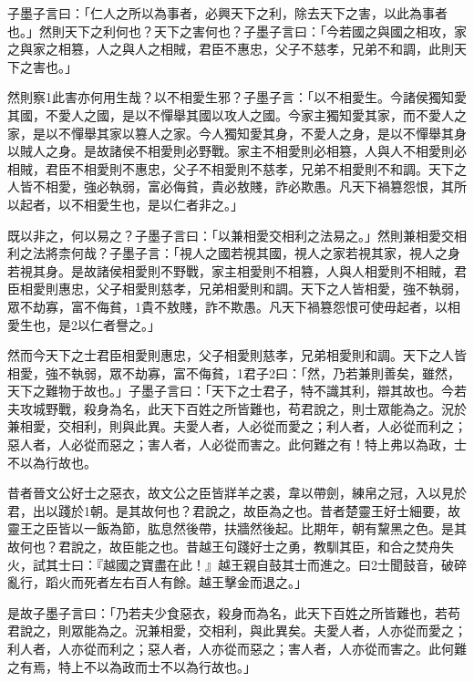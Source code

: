 
\begin{pinyinscope}
子墨子言曰：「仁人之所以為事者，必興天下之利，除去天下之害，以此為事者也。」然則天下之利何也？天下之害何也？子墨子言曰：「今若國之與國之相攻，家之與家之相篡，人之與人之相賊，君臣不惠忠，父子不慈孝，兄弟不和調，此則天下之害也。」

然則察1此害亦何用生哉？以不相愛生邪？子墨子言：「以不相愛生。今諸侯獨知愛其國，不愛人之國，是以不憚舉其國以攻人之國。今家主獨知愛其家，而不愛人之家，是以不憚舉其家以篡人之家。今人獨知愛其身，不愛人之身，是以不憚舉其身以賊人之身。是故諸侯不相愛則必野戰。家主不相愛則必相篡，人與人不相愛則必相賊，君臣不相愛則不惠忠，父子不相愛則不慈孝，兄弟不相愛則不和調。天下之人皆不相愛，強必執弱，富必侮貧，貴必敖賤，詐必欺愚。凡天下禍篡怨恨，其所以起者，以不相愛生也，是以仁者非之。」

既以非之，何以易之？子墨子言曰：「以兼相愛交相利之法易之。」然則兼相愛交相利之法將柰何哉？子墨子言：「視人之國若視其國，視人之家若視其家，視人之身若視其身。是故諸侯相愛則不野戰，家主相愛則不相篡，人與人相愛則不相賊，君臣相愛則惠忠，父子相愛則慈孝，兄弟相愛則和調。天下之人皆相愛，強不執弱，眾不劫寡，富不侮貧，1貴不敖賤，詐不欺愚。凡天下禍篡怨恨可使毋起者，以相愛生也，是2以仁者譽之。」

然而今天下之士君臣相愛則惠忠，父子相愛則慈孝，兄弟相愛則和調。天下之人皆相愛，強不執弱，眾不劫寡，富不侮貧，1君子2曰：「然，乃若兼則善矣，雖然，天下之難物于故也。」子墨子言曰：「天下之士君子，特不識其利，辯其故也。今若夫攻城野戰，殺身為名，此天下百姓之所皆難也，苟君說之，則士眾能為之。況於兼相愛，交相利，則與此異。夫愛人者，人必從而愛之；利人者，人必從而利之；惡人者，人必從而惡之；害人者，人必從而害之。此何難之有！特上弗以為政，士不以為行故也。

昔者晉文公好士之惡衣，故文公之臣皆牂羊之裘，韋以帶劍，練帛之冠，入以見於君，出以踐於1朝。是其故何也？君說之，故臣為之也。昔者楚靈王好士細要，故靈王之臣皆以一飯為節，肱息然後帶，扶牆然後起。比期年，朝有黧黑之色。是其故何也？君說之，故臣能之也。昔越王句踐好士之勇，教馴其臣，和合之焚舟失火，試其士曰：『越國之寶盡在此！』越王親自鼓其士而進之。曰2士聞鼓音，破碎亂行，蹈火而死者左右百人有餘。越王擊金而退之。」

是故子墨子言曰：「乃若夫少食惡衣，殺身而為名，此天下百姓之所皆難也，若苟君說之，則眾能為之。況兼相愛，交相利，與此異矣。夫愛人者，人亦從而愛之；利人者，人亦從而利之；惡人者，人亦從而惡之；害人者，人亦從而害之。此何難之有焉，特上不以為政而士不以為行故也。」


\end{pinyinscope}
